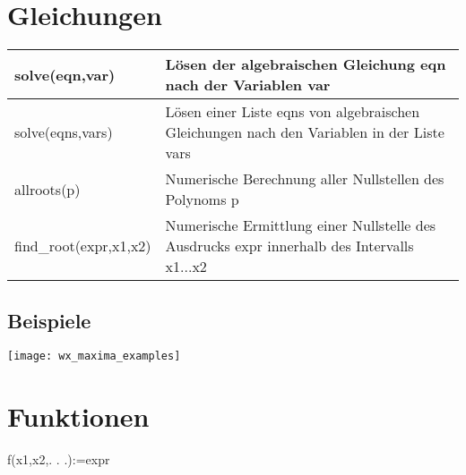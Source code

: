 \documentclass[../main.tex]{subfiles}
\begin{document}
\section{Gleichungen}
\begin{tabularx}{1.0\textwidth} { 
    >{\centering\arraybackslash}X 
    >{\centering\arraybackslash}X  }
    solve(eqn,var) & Lösen der algebraischen Gleichung eqn nach der Variablen var
    \\ [7pt]
    \hline
    solve(eqns,vars) & Lösen einer Liste eqns von algebraischen Gleichungen nach den Variablen in der Liste vars
    \\ [7pt]
    \hline
    allroots(p) & Numerische Berechnung aller Nullstellen des Polynoms p
    \\ [7pt]
    \hline
    find\_root(expr,x1,x2) & Numerische Ermittlung einer Nullstelle des Ausdrucks expr innerhalb des Intervalls x1...x2
    \\ [7pt]
    \hline
\end{tabularx}

\subsection{Beispiele}
\texttt{[image: wx\_maxima\_examples]}

\section{Funktionen}
f(x1,x2,. . .):=expr

\iffalse
\begin{tabularx}{1.0\textwidth} { 
    >{\centering\arraybackslash}X 
    >{\centering\arraybackslash}X  }
    &
    \\ [7pt]
    \hline
    &
    \\ [7pt]
    \hline
    &
    \\ [7pt]
    \hline
    &
    \\ [7pt]
    \hline
    &
    \\ [7pt]
    \hline
\end{tabularx}
\fi
\end{document}
